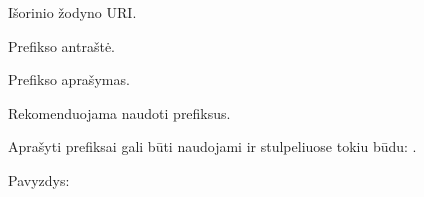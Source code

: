 \documentclass[letterpaper,10pt,lithuanian]{sphinxmanual}
\begin{document}

\begin{fulllineitems}
\label{\detokenize{dimensijos:prefix.uri}}
\pysigstartsignatures
{}
\pysigstopsignatures
\sphinxAtStartPar
Išorinio žodyno URI.

\end{fulllineitems}


\begin{fulllineitems}
\label{\detokenize{dimensijos:prefix.title}}
\pysigstartsignatures
{}
\pysigstopsignatures
\sphinxAtStartPar
Prefikso antraštė.

\end{fulllineitems}


\begin{fulllineitems}
\label{\detokenize{dimensijos:prefix.description}}
\pysigstartsignatures
{}
\pysigstopsignatures
\sphinxAtStartPar
Prefikso aprašymas.

\end{fulllineitems}


\sphinxAtStartPar
Rekomenduojama naudoti  prefiksus.

\sphinxAtStartPar
Aprašyti prefiksai gali būti naudojami {\hyperref[\detokenize{dimensijos:model.uri}]{}} ir {\hyperref[\detokenize{dimensijos:property.uri}]{}}
stulpeliuose tokiu būdu: .

\sphinxAtStartPar
Pavyzdys:
\end{document}
